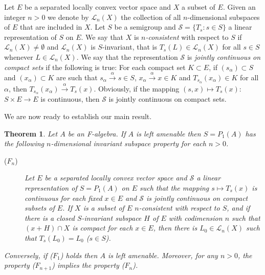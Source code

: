 \documentclass{tran-l}
\numberwithin{equation}{section}
\newtheorem{thm}{Theorem}[section]
\theoremstyle{definition}
\theoremstyle{remark}
\begin{document}
Let $E$ be a separated locally convex vector space and $X$ a subset of $E$. Given an integer $n>0$ we denote  by ${\mathcal{L}}_n(X)$ the collection of all $n$-dimensional subspaces of $E$ that are included in $X$. Let $S$ be a semigroup and ${\mathcal{S}} =\{T_s: s\in S\}$ a linear representation of $S$ on $E$. We say that $X$ is \emph{$n$-consistent} with respect to $S$ if ${\mathcal{L}}_n(X)\neq \emptyset$ and ${\mathcal{L}}_n(X)$ is $S$-invariant, that is $T_s(L) \in {\mathcal{L}}_n(X)$ for all $s\in S$ whenever $L\in {\mathcal{L}}_n(X)$. We say that the representation ${\mathcal{S}}$ is \emph{jointly continuous on compact sets} if the following is true: For each compact set $K\subset E$, if $(s_{\alpha}) \subset S$ and $(x_{\alpha})\subset K$ are such that $s_{\alpha} \overset{\alpha}{\to}s\in S$,  $x_{\alpha} \overset{\alpha}{\to}x\in K$ and $T_{s_{\alpha}}(x_{\alpha})\in K$ for all ${\alpha}$, then $T_{s_{\alpha}}(x_{\alpha})\overset{\alpha}{\to}T_s(x)$. Obviously, if the mapping $(s,x) \mapsto T_s(x)$: $S\times E \to E$ is continuous, then ${\mathcal{S}}$ is jointly continuous on compact sets.

We are now ready to establish our main result.

\begin{thm}\label{KF thm}
Let $A$ be an F-algebra. If $A$ is left amenable then $S=P_1(A)$ has the following $n$-dimensional invariant subspace property for each $n>0$.
\begin{description}
\item[($F_n$)] Let $E$ be a separated locally convex vector space and ${\mathcal{S}}$ a linear representation of $S=P_1(A)$ on $E$ such that the mapping $s\mapsto T_s(x)$ is continuous for each fixed $x\in E$ and ${\mathcal{S}}$ is jointly continuous on compact subsets of $E$. If $X$ is a subset of $E$ $n$-consistent with respect to $S$, and if there is a closed $S$-invariant subspace $H$ of $E$ with codimension $n$ such that $(x+H)\cap X$ is compact for each $x\in E$, then there is $L_0\in {\mathcal{L}}_n(X)$ such that $T_s(L_0) = L_0$ ($s\in S$). \end{description}
Conversely, if ($F_1$) holds then $A$ is left amenable. Moreover, for any $n>0$, the property ($F_{n+1}$) implies the property ($F_n$).
\end{thm}
\proof
\end{document}

